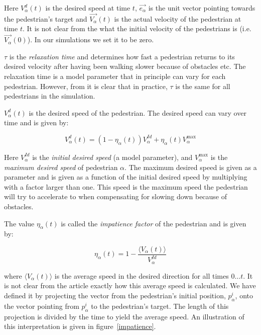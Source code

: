 Here $V_{\alpha}^{d}(t)$ is the desired speed at time $t$, 
$\overrightarrow{e_{\alpha}}$ is the unit vector pointing towards the 
pedestrian's target and  $\overrightarrow{V_{\alpha}}(t)$ is the actual 
velocity of the pedestrian at time $t$. It is not clear from the what the 
initial velocity of the pedestrians is (i.e. $\overrightarrow{V_\alpha}(0)$). 
In our simulations we set it to be zero.

$\tau$ is the \emph{relaxation time} and determines how fast a pedestrian 
returns to its desired velocity after having been walking slower because of 
obstacles etc. The relaxation time is a model parameter that in principle can vary 
for each pedestrian. However, from \cite{self-org} it is clear that in 
practice, $\tau$ is the same for all pedestrians in the simulation.

$V_{\alpha}^{d}(t)$ is the desired speed of the pedestrian. The desired speed 
can vary over time and is given by:

\begin{equation}\label{eqn:desired-speed}
    V_{\alpha}^{d}(t) = \left( 1 - \eta_{\alpha}(t) \right) 
    V_{\alpha}^{Id} +
    \eta_{\alpha}(t) V_{\alpha}^{\text{max}}
\end{equation}

Here $V_{\alpha}^{Id}$ is the \emph{initial desired speed} (a model 
parameter), and $V_{\alpha}^{\text{max}}$ is the \emph{maximum desired speed} 
of pedestrian $\alpha$. The maximum desired speed is given as a parameter and 
is given as a function of the initial desired speed by multiplying with a 
factor larger than one. This speed is the maximum speed the pedestrian will 
try to accelerate to when compensating for slowing down because of obstacles.

The value $\eta_{\alpha}(t)$ is called the \emph{impatience factor} of the 
pedestrian and is given by:

\begin{equation}\label{eqn:impatience}
	\eta_{\alpha}(t) =
    1 - \frac{\langle V_{\alpha}(t)\rangle}{V^{Id}_{\alpha}}
\end{equation}

where $\langle V_{\alpha}(t) \rangle$ is the average speed in the desired 
direction for all times $0\dots t$. It is not clear from the article exactly 
how this average speed is calculated. We have defined it by projecting the 
vector from the pedestrian's initial position, $p^i_\alpha$, onto the vector 
pointing from $p^i_\alpha$ to the pedestrian's target. The length of this 
projection is divided by the time to yield the average speed. An 
illustration of this interpretation is given in figure~\ref{impatience}.

